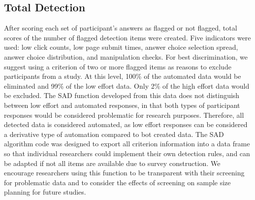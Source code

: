 \documentclass[english,man]{apa6}
\theoremstyle{definition}
\theoremstyle{definition}
\theoremstyle{definition}
\theoremstyle{remark}
\begin{document}
\subsection{Total Detection}\label{total-detection}

After scoring each set of participant's answers as flagged or not
flagged, total scores of the number of flagged detection items were
created. Five indicators were used: low click counts, low page submit
times, answer choice selection spread, answer choice distribution, and
manipulation checks. For best discrimination, we suggest using a
criterion of two or more flagged items as reasons to exclude
participants from a study. At this level, 100\% of the automated data
would be eliminated and 99\% of the low effort data. Only 2\% of the
high effort data would be excluded. The SAD function developed from this
data does not distinguish between low effort and automated responses, in
that both types of participant responses would be considered problematic
for research purposes. Therefore, all detected data is considered
automated, as low effort responses can be considered a derivative type
of automation compared to bot created data. The SAD algorithm code was
designed to export all criterion information into a data frame so that
individual researchers could implement their own detection rules, and
can be adapted if not all items are available due to survey
construction. We encourage researchers using this function to be
transparent with their screening for problematic data and to consider
the effects of screening on sample size planning for future studies.
\end{document}
